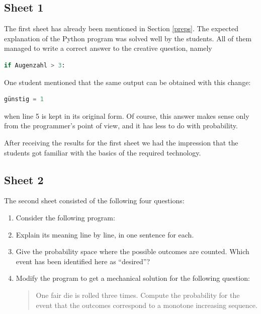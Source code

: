\documentclass[]{interact}
\theoremstyle{plain}%
\theoremstyle{definition}
\theoremstyle{remark}
\begin{document}
\subsection*{Sheet 1}
The first sheet has already been mentioned in Section \ref{preps}.
The expected explanation of the Python program was solved well by the students.
All of them managed to write a correct answer to the creative question, namely
\begin{lstlisting}[language=Python,firstnumber=5]
  if Augenzahl > 3:
\end{lstlisting}
One student mentioned that the same output can be obtained with this change:
\begin{lstlisting}[language=Python,firstnumber=2]
günstig = 1
\end{lstlisting}
when line 5 is kept in its original form. Of course, this answer makes sense
only from the programmer's point of view, and it has less to do with probability.

After receiving the results for the first sheet we had the impression that
the students got familiar with the basics of the required technology.

\subsection*{Sheet 2}

The second sheet consisted of the following four questions:

\begin{enumerate}
\item Consider the following program:


\item Explain its meaning line by line, in one sentence for each.

\item Give the probability space where the possible outcomes are counted.
Which event has been identified here as ``desired''?

\item Modify the program to get a mechanical solution for the following question:

\begin{quote}
One fair die is rolled three times. Compute the probability for the event that the outcomes
correspond to a monotone increasing sequence.
\end{quote}

\end{enumerate}
\end{document}
